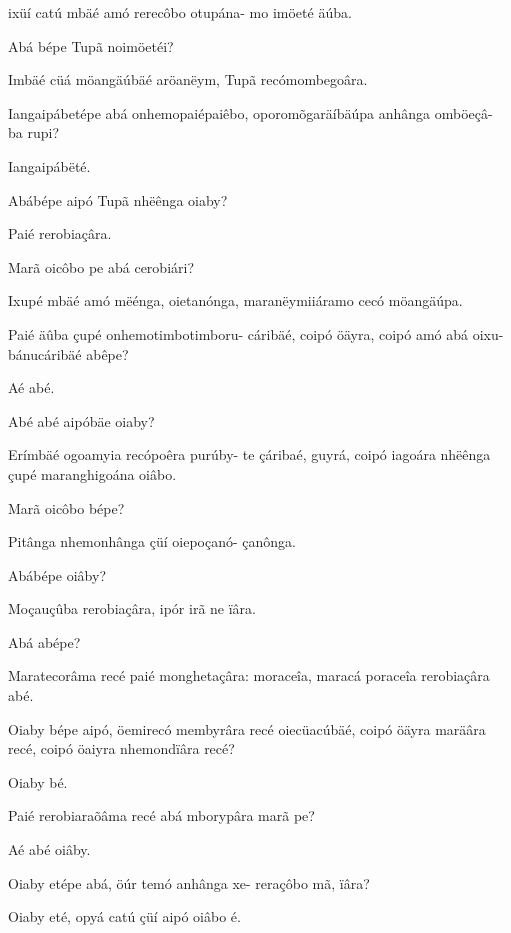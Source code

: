 \documentclass[openany,titlepage,12pt]{book}
\begin{document}
\begin{altereven}
        ixüí catú mbäé amó rerecôbo otupána-\linebreak
        mo imöeté äúba.
    \item Abá bépe Tupã noimöetéi?
    \item Imbäé cüá möangäúbäé aröanëym, Tupã
        recómombegoâra.
    \item Iangaipábetépe abá onhemopaiépaiêbo,
        oporomõgaräíbäúpa anhânga omböeçâ-\linebreak
        ba rupi?
    \item Iangaipábëté.
    \item Abábépe aipó Tupã nhëênga oiaby?
    \item Paié rerobiaçâra.
    \item Marã oicôbo pe abá cerobiári?
    \item Ixupé mbäé amó mëénga, oietanónga,\linebreak
        maranëymiiáramo cecó möangäúpa.
    \item Paié äûba çupé onhemotimbotimboru-
        cáribäé, coipó öäyra, coipó amó abá oixu-
        bánucáribäé abêpe?
    \item Aé abé.
    \item Abé abé aipóbäe oiaby?
    \item Erímbäé ogoamyia recópoêra purúby-\linebreak
        te çáribaé, guyrá, coipó iagoára nhëênga\linebreak
        \newpage
        çupé maranghigoána oiâbo.
    \item Marã oicôbo bépe?
    \item Pitânga nhemonhânga çüí oiepoçanó-\linebreak
        çanônga.
    \item Abábépe oiâby?
    \item Moçauçûba rerobiaçâra, ipór irã ne ïâra.
    \item Abá abépe?
    \item Maratecorâma recé paié monghetaçâra:
        moraceîa, maracá poraceîa rerobiaçâra\linebreak
        abé.
    \item Oiaby bépe aipó, öemirecó membyrâra
        recé oiecüacúbäé, coipó öäyra maräâra\linebreak
        recé, coipó öaiyra nhemondïâra recé?
    \item Oiaby bé.
    \item Paié rerobiaraõâma recé abá mborypâra
        marã pe?
    \item Aé abé oiâby.
    \item Oiaby etépe abá, öúr temó anhânga xe-
        reraçôbo mã, ïâra?
    \item Oiaby eté, opyá catú çüí aipó oiâbo é.    
\end{altereven}
\end{document}
